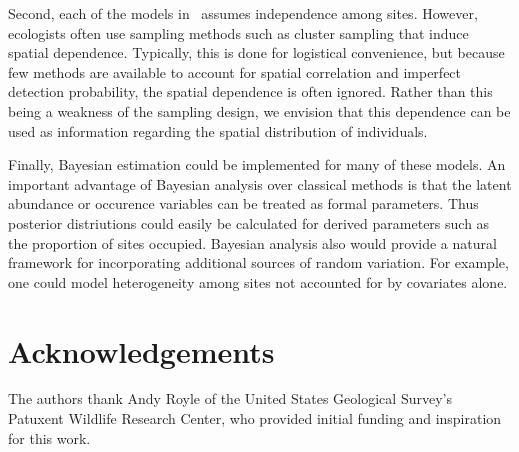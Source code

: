 \documentclass[article,shortnames]{jss}
\newcommand{\um}{\pkg{unmarked}}
\begin{document}
Second, each of the models in \um\ assumes independence among sites. However, 
ecologists often use sampling methods such as cluster sampling that induce 
spatial dependence. Typically, this is done for logistical convenience, but 
because few methods are available to account for spatial correlation and 
imperfect detection probability, the spatial dependence is often ignored.  
Rather than this being a weakness of the sampling design, we envision that 
this dependence can be used as information regarding the spatial distribution
of individuals.  

Finally, Bayesian estimation could be implemented for many of these models.  An 
important advantage of Bayesian analysis over classical methods is that the 
latent abundance or occurence variables can be treated as formal parameters.  
Thus posterior distriutions could easily be calculated for derived parameters 
such as the proportion of sites occupied.  Bayesian analysis also would provide 
a natural framework for incorporating additional sources of random variation.  
For example, one could model heterogeneity among sites not accounted for by 
covariates alone.  

\section*{Acknowledgements}

The authors thank Andy Royle of the United States Geological Survey's
Patuxent Wildlife Research Center, who provided initial funding and
inspiration for this work.


\end{document}
